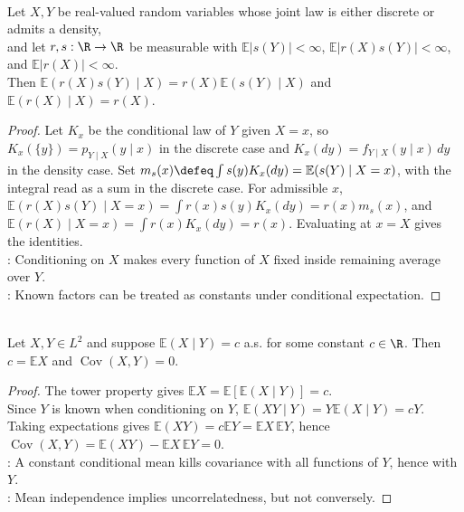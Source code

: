 \begin{proposition} \label{prop:conditional-expectation-pull-out-known-factor} \\
Let $X,Y$ be real-valued random variables whose joint law is either discrete or admits a density,\\
and let $r,s:\R\to\R$ be measurable with $\mathbb{E}|s(Y)|<\infty$, $\mathbb{E}|r(X)s(Y)|<\infty$, and $\mathbb{E}|r(X)|<\infty$.\\
Then $\mathbb{E}(r(X)s(Y)\mid X)=r(X)\mathbb{E}(s(Y)\mid X)$ and $\mathbb{E}(r(X)\mid X)=r(X)$.
\begin{proof}
Let $K_x$ be the conditional law of $Y$ given $X=x$, so $K_x(\{y\})=p_{Y\mid X}(y\mid x)$ in the discrete case and $K_x(dy)=f_{Y\mid X}(y\mid x)\,dy$ in the density case.
Set $m_s(x)\defeq\int s(y)K_x(dy)=\mathbb{E}(s(Y)\mid X=x)$, with the integral read as a sum in the discrete case.
For admissible $x$, $\mathbb{E}(r(X)s(Y)\mid X=x)=\int r(x)s(y)K_x(dy)=r(x)m_s(x)$, and $\mathbb{E}(r(X)\mid X=x)=\int r(x)K_x(dy)=r(x)$.
Evaluating at $x=X$ gives the identities.\\
: Conditioning on $X$ makes every function of $X$ fixed inside remaining average over $Y$.\\
: Known factors can be treated as constants under conditional expectation.
\end{proof}
\end{proposition}

\begin{corollary} \label{cor:constant-conditional-mean-implies-uncorrelated} \\
Let $X,Y\in L^2$ and suppose $\mathbb{E}(X\mid Y)=c$ a.s. for some constant $c\in\R$. Then $c=\mathbb{E}X$ and $\operatorname{Cov}(X,Y)=0$.
\begin{proof}
The tower property gives $\mathbb{E}X=\mathbb{E}[\mathbb{E}(X\mid Y)]=c$.\\
Since $Y$ is known when conditioning on $Y$, $\mathbb{E}(XY\mid Y)=Y\mathbb{E}(X\mid Y)=cY$.\\
Taking expectations gives $\mathbb{E}(XY)=c\mathbb{E}Y=\mathbb{E}X\,\mathbb{E}Y$, hence $\operatorname{Cov}(X,Y)=\mathbb{E}(XY)-\mathbb{E}X\,\mathbb{E}Y=0$.\\
: A constant conditional mean kills covariance with all functions of $Y$, hence with $Y$.\\
: Mean independence implies uncorrelatedness, but not conversely.
\end{proof}
\end{corollary}

